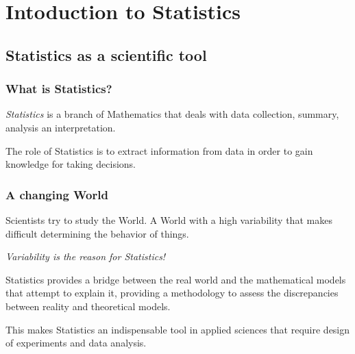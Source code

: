 \section{Intoduction to Statistics}



\subsection{Statistics as a scientific tool}
\begin{frame}
\frametitle{What is Statistics?}
\begin{definition}[Statistics]
\emph{Statistics} is a branch of Mathematics that deals with data collection, summary, analysis an interpretation.
\end{definition}

The role of Statistics is to extract information from data in order to gain knowledge for taking decisions.

\begin{center}
\resizebox{\textwidth}{!}{

}
\end{center}


\end{frame}


\begin{frame}
\frametitle{A changing World}
Scientists try to study the World. A World with a high variability that makes difficult determining the behavior of
things.

\begin{center}
\alert{\emph{Variability is the reason for Statistics!}}
\end{center}

Statistics provides a bridge between the real world and the mathematical models that attempt to
explain it, providing a methodology to assess the discrepancies between reality and theoretical models.

This makes Statistics an indispensable tool in applied sciences that require design of experiments and data analysis.
\end{frame}



